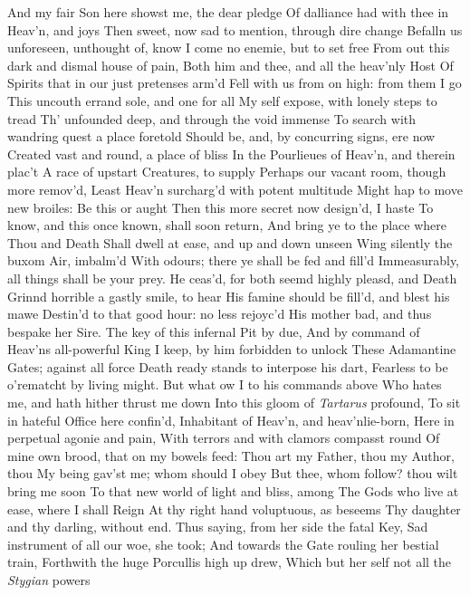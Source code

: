 \documentclass[11pt]{book}
\begin{document}
And my fair Son here showst me, the dear pledge 
Of dalliance had with thee in Heav'n, and joys 
Then sweet, now sad to mention, through dire change 
Befalln us unforeseen, unthought of, know 
I come no enemie, but to set free 
From out this dark and dismal house of pain, 
Both him and thee, and all the heav'nly Host 
Of Spirits that in our just pretenses arm'd 
Fell with us from on high: from them I go 
This uncouth errand sole, and one for all 
My self expose, with lonely steps to tread 
Th' unfounded deep, and through the void immense 
To search with wandring quest a place foretold 
Should be, and, by concurring signs, ere now 
Created vast and round, a place of bliss 
In the Pourlieues of Heav'n, and therein plac't 
A race of upstart Creatures, to supply 
Perhaps our vacant room, though more remov'd, 
Least Heav'n surcharg'd with potent multitude 
Might hap to move new broiles: Be this or aught 
Then this more secret now design'd, I haste 
To know, and this once known, shall soon return, 
And bring ye to the place where Thou and Death 
Shall dwell at ease, and up and down unseen 
Wing silently the buxom Air, imbalm'd 
With odours; there ye shall be fed and fill'd 
Immeasurably, all things shall be your prey. 
He ceas'd, for both seemd highly pleasd, and Death 
Grinnd horrible a gastly smile, to hear 
His famine should be fill'd, and blest his mawe 
Destin'd to that good hour: no less rejoyc'd 
His mother bad, and thus bespake her Sire. 
\quad The key of this infernal Pit by due, 
And by command of Heav'ns all-powerful King 
I keep, by him forbidden to unlock 
These Adamantine Gates; against all force 
Death ready stands to interpose his dart, 
Fearless to be o'rematcht by living might. 
But what ow I to his commands above 
Who hates me, and hath hither thrust me down 
Into this gloom of \textit{Tartarus} profound, 
To sit in hateful Office here confin'd, 
Inhabitant of Heav'n, and heav'nlie-born, 
Here in perpetual agonie and pain, 
With terrors and with clamors compasst round 
Of mine own brood, that on my bowels feed: 
Thou art my Father, thou my Author, thou 
My being gav'st me; whom should I obey 
But thee, whom follow? thou wilt bring me soon 
To that new world of light and bliss, among 
The Gods who live at ease, where I shall Reign 
At thy right hand voluptuous, as beseems 
Thy daughter and thy darling, without end. 
\quad Thus saying, from her side the fatal Key, 
Sad instrument of all our woe, she took; 
And towards the Gate rouling her bestial train, 
Forthwith the huge Porcullis high up drew, 
Which but her self not all the \textit{Stygian} powers 
\end{document}
